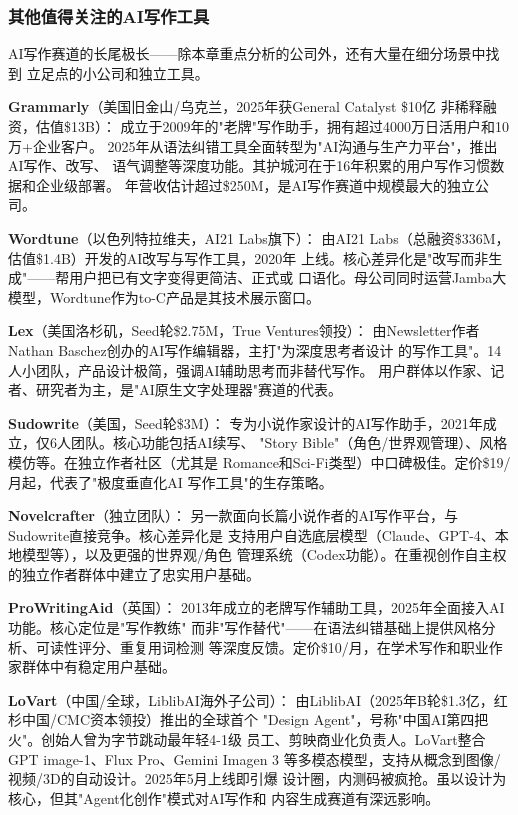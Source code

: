\subsubsection{其他值得关注的AI写作工具}

AI写作赛道的长尾极长——除本章重点分析的公司外，还有大量在细分场景中找到
立足点的小公司和独立工具。

\textbf{Grammarly}（美国旧金山/乌克兰，2025年获General Catalyst \$10亿
非稀释融资，估值\$13B）：
成立于2009年的"老牌"写作助手，拥有超过4000万日活用户和10万+企业客户。
2025年从语法纠错工具全面转型为"AI沟通与生产力平台"，推出AI写作、改写、
语气调整等深度功能。其护城河在于16年积累的用户写作习惯数据和企业级部署。
年营收估计超过\$250M，是AI写作赛道中规模最大的独立公司。

\textbf{Wordtune}（以色列特拉维夫，AI21 Labs旗下）：
由AI21 Labs（总融资\$336M，估值\$1.4B）开发的AI改写与写作工具，2020年
上线。核心差异化是"改写而非生成"——帮用户把已有文字变得更简洁、正式或
口语化。母公司同时运营Jamba大模型，Wordtune作为to-C产品是其技术展示窗口。

\textbf{Lex}（美国洛杉矶，Seed轮\$2.75M，True Ventures领投）：
由Newsletter作者Nathan Baschez创办的AI写作编辑器，主打"为深度思考者设计
的写作工具"。14人小团队，产品设计极简，强调AI辅助思考而非替代写作。
用户群体以作家、记者、研究者为主，是"AI原生文字处理器"赛道的代表。

\textbf{Sudowrite}（美国，Seed轮\$3M）：
专为小说作家设计的AI写作助手，2021年成立，仅6人团队。核心功能包括AI续写、
"Story Bible"（角色/世界观管理）、风格模仿等。在独立作者社区（尤其是
Romance和Sci-Fi类型）中口碑极佳。定价\$19/月起，代表了"极度垂直化AI
写作工具"的生存策略。

\textbf{Novelcrafter}（独立团队）：
另一款面向长篇小说作者的AI写作平台，与Sudowrite直接竞争。核心差异化是
支持用户自选底层模型（Claude、GPT-4、本地模型等），以及更强的世界观/角色
管理系统（Codex功能）。在重视创作自主权的独立作者群体中建立了忠实用户基础。

\textbf{ProWritingAid}（英国）：
2013年成立的老牌写作辅助工具，2025年全面接入AI功能。核心定位是"写作教练"
而非"写作替代"——在语法纠错基础上提供风格分析、可读性评分、重复用词检测
等深度反馈。定价\$10/月，在学术写作和职业作家群体中有稳定用户基础。

\textbf{LoVart}（中国/全球，LiblibAI海外子公司）：
由LiblibAI（2025年B轮\$1.3亿，红杉中国/CMC资本领投）推出的全球首个
"Design Agent"，号称"中国AI第四把火"。创始人曾为字节跳动最年轻4-1级
员工、剪映商业化负责人。LoVart整合GPT image-1、Flux Pro、Gemini Imagen 3
等多模态模型，支持从概念到图像/视频/3D的自动设计。2025年5月上线即引爆
设计圈，内测码被疯抢。虽以设计为核心，但其"Agent化创作"模式对AI写作和
内容生成赛道有深远影响。

